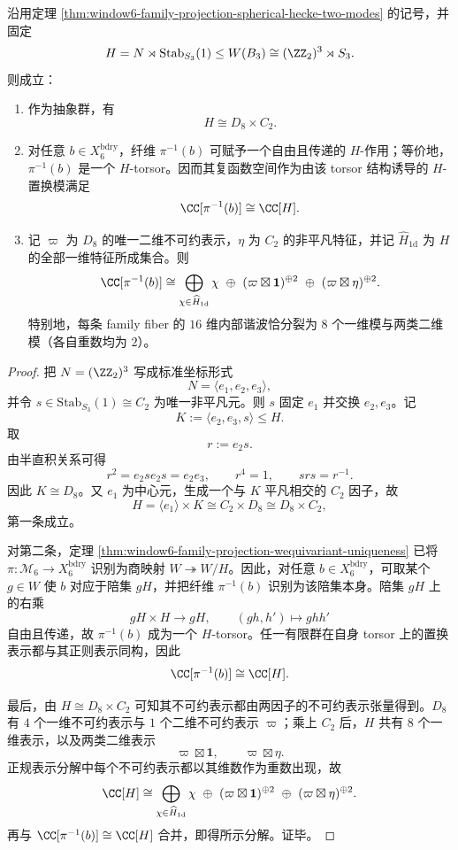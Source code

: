 \begin{theorem}\label{thm:window6-family-fiber-d8c2-regular-spectrum}
沿用定理 \ref{thm:window6-family-projection-spherical-hecke-two-modes} 的记号，并固定
\[
H=N\rtimes \mathrm{Stab}_{S_3}(1)\le W(B_3)\cong (\ZZ_2)^3\rtimes S_3.
\]
则成立：
\begin{enumerate}
  \item 作为抽象群，有
  \[
  H\cong D_8\times C_2.
  \]
  \item 对任意 \(b\in X_6^{\mathrm{bdry}}\)，纤维 \(\pi^{-1}(b)\) 可赋予一个自由且传递的 \(H\)-作用；等价地，\(\pi^{-1}(b)\) 是一个 \(H\)-torsor。因而其复函数空间作为由该 torsor 结构诱导的 \(H\)-置换模满足
  \[
  \CC[\pi^{-1}(b)]\cong \CC[H].
  \]
  \item 记 \(\varpi\) 为 \(D_8\) 的唯一二维不可约表示，\(\eta\) 为 \(C_2\) 的非平凡特征，并记 \(\widehat H_{1\mathrm d}\) 为 \(H\) 的全部一维特征所成集合。则
  \[
  \CC[\pi^{-1}(b)]
  \cong
  \bigoplus_{\chi\in\widehat H_{1\mathrm d}}\chi
  \ \oplus\
  (\varpi\boxtimes \mathbf 1)^{\oplus 2}
  \ \oplus\
  (\varpi\boxtimes \eta)^{\oplus 2}.
  \]
  特别地，每条 family fiber 的 \(16\) 维内部谐波恰分裂为 \(8\) 个一维模与两类二维模（各自重数均为 \(2\)）。
\end{enumerate}
\end{theorem}
\begin{proof}
把 \(N=(\ZZ_2)^3\) 写成标准坐标形式
\[
N=\langle e_1,e_2,e_3\rangle,
\]
并令 \(s\in \mathrm{Stab}_{S_3}(1)\cong C_2\) 为唯一非平凡元。则 \(s\) 固定 \(e_1\) 并交换 \(e_2,e_3\)。记
\[
K:=\langle e_2,e_3,s\rangle\le H.
\]
取
\[
r:=e_2s.
\]
由半直积关系可得
\[
r^2=e_2se_2s=e_2e_3,
\qquad
r^4=1,
\qquad
srs=r^{-1}.
\]
因此 \(K\cong D_8\)。又 \(e_1\) 为中心元，生成一个与 \(K\) 平凡相交的 \(C_2\) 因子，故
\[
H=\langle e_1\rangle\times K\cong C_2\times D_8\cong D_8\times C_2,
\]
第一条成立。

对第二条，定理 \ref{thm:window6-family-projection-wequivariant-uniqueness} 已将 \(\pi:\mathcal M_6\to X_6^{\mathrm{bdry}}\) 识别为商映射 \(W\twoheadrightarrow W/H\)。因此，对任意 \(b\in X_6^{\mathrm{bdry}}\)，可取某个 \(g\in W\) 使 \(b\) 对应于陪集 \(gH\)，并把纤维 \(\pi^{-1}(b)\) 识别为该陪集本身。陪集 \(gH\) 上的右乘
\[
gH\times H\to gH,\qquad (gh,h')\mapsto ghh'
\]
自由且传递，故 \(\pi^{-1}(b)\) 成为一个 \(H\)-torsor。任一有限群在自身 torsor 上的置换表示都与其正则表示同构，因此
\[
\CC[\pi^{-1}(b)]\cong \CC[H].
\]

最后，由 \(H\cong D_8\times C_2\) 可知其不可约表示都由两因子的不可约表示张量得到。\(D_8\) 有 \(4\) 个一维不可约表示与 \(1\) 个二维不可约表示 \(\varpi\)；乘上 \(C_2\) 后，\(H\) 共有 \(8\) 个一维表示，以及两类二维表示
\[
\varpi\boxtimes \mathbf 1,
\qquad
\varpi\boxtimes \eta.
\]
正规表示分解中每个不可约表示都以其维数作为重数出现，故
\[
\CC[H]
\cong
\bigoplus_{\chi\in\widehat H_{1\mathrm d}}\chi
\ \oplus\
(\varpi\boxtimes \mathbf 1)^{\oplus 2}
\ \oplus\
(\varpi\boxtimes \eta)^{\oplus 2}.
\]
再与 \(\CC[\pi^{-1}(b)]\cong \CC[H]\) 合并，即得所示分解。证毕。
\end{proof}

